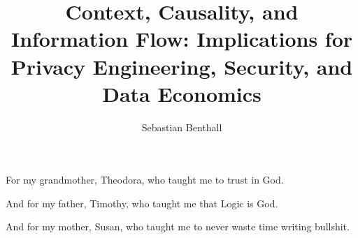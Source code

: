 \documentclass[12pt, oneside]{lib/ucthesis}
\begin{document}

\title{Context, Causality, and Information Flow: Implications for Privacy Engineering, Security, and Data Economics}
\author{Sebastian Benthall}

\prevdegrees{} %



	


\begin{frontmatter} 
\maketitle
\approvalpage
\copyrightpage
\abstract



	\abstractsignature
\endabstract

\end{frontmatter}
\begin{optionalFrontMatter}
\begin{dedication}
	\vspace*{\fill} 
	For my grandmother, Theodora, who taught me to trust in God.

        And for my father, Timothy, who taught me that Logic is God.

        And for my mother, Susan, who taught me to never waste time writing bullshit.
	\vspace*{\fill} 
\end{dedication}
\end{optionalFrontMatter}
\end{document}

